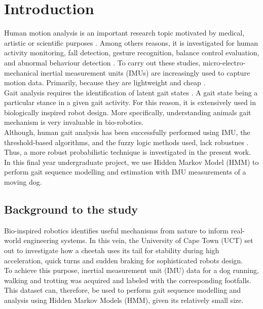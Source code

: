 \chapter{Introduction}

Human motion analysis is an important research topic motivated by medical, artistic or scientific purposes \cite{towa2009}. Among others reasons, it is investigated for human activity monitoring, fall detection, gesture recognition, balance control evaluation, and abnormal behaviour detection \cite{cont2013}. To carry out these studies, micro-electro-mechanical inertial measurement units (IMUs) are increasingly used to capture motion data. Primarily, because they are lightweight and cheap \cite{ches2012} \cite{towa2009} \cite{cont2013}.\\
Gait analysis requires the identification of latent gait states \cite{cont2013}. A gait state being a particular stance in a given gait activity.
For this reason, it is extensively used in biologically inspired robot design. More specifically, understanding animals gait mechanism is very invaluable in bio-robotics.\\
Although, human gait analysis has been successfully performed using IMU, the threshold-based algorithms, %
and the fuzzy logic methods %
used, lack robustnes \cite{cont2013}. Thus, a more robust probabilistic technique is investigated in the present work. In this final year undergraduate project, we use Hidden Markov Model (HMM) to perform gait sequence modelling and estimation with IMU measurements of a moving dog.


\section{Background to the study}
Bio-inspired robotics identifies useful mechanisms from nature to inform real-world engineering systems. In this vein, the University of Cape Town (UCT) set out to investigate how a cheetah uses its tail for stability during high acceleration, quick turns and sudden braking for sophisticated robots design. \\
To achieve this purpose, inertial measurement unit (IMU) data for a dog running, walking and trotting was acquired and labeled with the corresponding footfalls.\\
This dataset can, therefore, be used to perform gait sequence modelling and analysis using Hidden Markov Models (HMM), given its relatively small size. 	%

